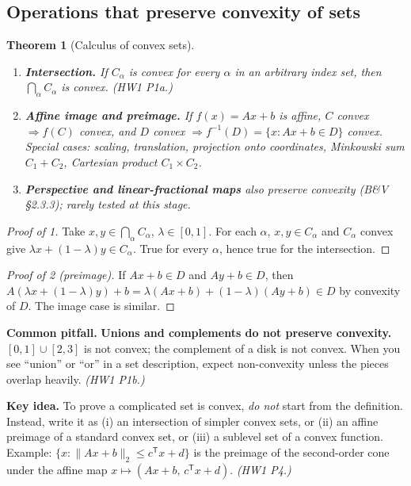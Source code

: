 \documentclass[11pt]{article}
\newenvironment{keyidea}{\begin{shaded}\noindent\textbf{Key idea.} }{\end{shaded}}
\newenvironment{pitfall}{\colorlet{shadecolor}{warncolor}\begin{shaded}\noindent\textbf{Common pitfall.} }{\end{shaded}}
\newcommand{\T}{^{\mathsf T}}
\newcommand{\lam}{\lambda}
\theoremstyle{definition}
\theoremstyle{plain}
\newtheorem{theorem}[definition]{Theorem}
\theoremstyle{remark}
\begin{document}
\subsection{Operations that preserve convexity of sets}
\begin{theorem}[Calculus of convex sets]\label{thm:setcalc}\leavevmode
\begin{enumerate}
\item \textbf{Intersection.} If $C_\alpha$ is convex for every $\alpha$ in an arbitrary index set, then $\bigcap_\alpha C_\alpha$ is convex. \emph{(HW1 P1a.)}
\item \textbf{Affine image and preimage.} If $f(x)=Ax+b$ is affine, $C$ convex $\Rightarrow f(C)$ convex, and $D$ convex $\Rightarrow f^{-1}(D)=\{x:Ax+b\in D\}$ convex. Special cases: scaling, translation, projection onto coordinates, Minkowski sum $C_1+C_2$, Cartesian product $C_1\times C_2$.
\item \textbf{Perspective and linear-fractional maps} also preserve convexity (B\&V \S2.3.3); rarely tested at this stage.
\end{enumerate}
\end{theorem}

\begin{proof}[Proof of 1]
Take $x,y\in\bigcap_\alpha C_\alpha$, $\lam\in[0,1]$. For each $\alpha$, $x,y\in C_\alpha$ and $C_\alpha$ convex give $\lam x+(1-\lam)y\in C_\alpha$. True for every $\alpha$, hence true for the intersection.
\end{proof}
\begin{proof}[Proof of 2 (preimage)]
If $Ax+b\in D$ and $Ay+b\in D$, then $A(\lam x+(1-\lam)y)+b=\lam(Ax+b)+(1-\lam)(Ay+b)\in D$ by convexity of $D$. The image case is similar.
\end{proof}

\begin{pitfall}
\textbf{Unions and complements do not preserve convexity.} $[0,1]\cup[2,3]$ is not convex; the complement of a disk is not convex. When you see ``union'' or ``or'' in a set description, expect non-convexity unless the pieces overlap heavily. \emph{(HW1 P1b.)}
\end{pitfall}

\begin{keyidea}
To prove a complicated set is convex, \emph{do not} start from the definition. Instead, write it as (i) an intersection of simpler convex sets, or (ii) an affine preimage of a standard convex set, or (iii) a sublevel set of a convex function. Example: $\{x:\|Ax+b\|_2\le c\T x+d\}$ is the preimage of the second-order cone under the affine map $x\mapsto(Ax+b,\,c\T x+d)$. \emph{(HW1 P4.)}
\end{keyidea}
\end{document}
